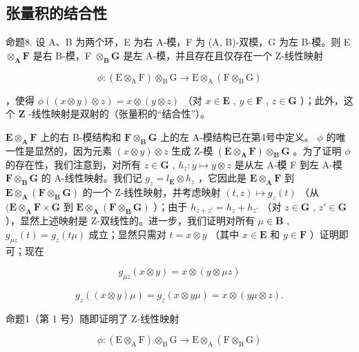 \subsection{张量积的结合性}

命题8. 设 A、B 为两个环，E 为右 A-模，F 为 (A, B)-双模，G 为左 B-模。则 E \(\otimes_{\mathbf{A}} \mathbf{F}\) 是右 B-模，F \(\otimes_{\mathbf{B}} \mathbf{G}\) 是左 A-模，并且存在且仅存在一个 Z-线性映射

\[
\phi : (\mathrm{E} \otimes_ {\mathrm{A}} \mathrm{F}) \otimes_ {\mathrm{B}} \mathrm{G} \rightarrow \mathrm{E} \otimes_ {\mathrm{A}} (\mathrm{F} \otimes_ {\mathrm{B}} \mathrm{G})
\]

，使得 \(\phi((x \otimes y) \otimes z) = x \otimes (y \otimes z)\) （对 \(x \in \mathbf{E}\) , \(y \in \mathbf{F}\) , \(z \in \mathbf{G}\) ）；此外，这个 \(\mathbf{Z}\) -线性映射是双射的（张量积的“结合性”）。

\(\mathbf{E} \otimes_{\mathbf{A}} \mathbf{F}\) 上的右 B-模结构和 \(\mathbf{F} \otimes_{\mathbf{B}} \mathbf{G}\) 上的左 A-模结构已在第4号中定义。 \(\phi\) 的唯一性是显然的，因为元素 \((x \otimes y) \otimes z\) 生成 Z-模 \((\mathbf{E} \otimes_{\mathbf{A}} \mathbf{F}) \otimes_{\mathbf{B}} \mathbf{G}\) 。为了证明 \(\phi\) 的存在性，我们注意到，对所有 \(z \in \mathbf{G}\) , \(h_z: y \mapsto y \otimes z\) 是从左 A-模 F 到左 A-模 \(\mathbf{F} \otimes_{\mathbf{B}} \mathbf{G}\) 的 A-线性映射。我们记 \(g_z = l_{\mathbf{E}} \otimes h_z\) ，它因此是 \(\mathbf{E} \otimes_{\mathbf{A}} \mathbf{F}\) 到 \(\mathbf{E} \otimes_{\mathbf{A}} (\mathbf{F} \otimes_{\mathbf{B}} \mathbf{G})\) 的一个 Z-线性映射，并考虑映射 \((t, z) \mapsto g_z(t)\) （从 \((\mathbf{E} \otimes_{\mathbf{A}} \mathbf{F} \times \mathbf{G}\) 到 \(\mathbf{E} \otimes_{\mathbf{A}} (\mathbf{F} \otimes_{\mathbf{B}} \mathbf{G})\) ）；由于 \(h_{z+z'} = h_z + h_{z'}\) （对 \(z \in \mathbf{G}\) , \(z' \in \mathbf{G}\) ），显然上述映射是 Z-双线性的。进一步，我们证明对所有 \(\mu \in \mathbf{B}\) , \(g_{\mu z}(t) = g_z(t\mu)\) 成立；显然只需对 \(t = x \otimes y\) （其中 \(x \in \mathbf{E}\) 和 \(y \in \mathbf{F}\) ）证明即可；现在

\[
g _ {\mu z} (x \otimes y) = x \otimes (y \otimes \mu z)
\]

\[
g _ {z} ((x \otimes y) \mu) = g _ {z} (x \otimes y \mu) = x \otimes (y \mu \otimes z).
\]

命题1（第 1 号）随即证明了 Z-线性映射

\[
\phi : (\mathrm{E} \otimes_ {\mathrm{A}} \mathrm{F}) \otimes_ {\mathrm{B}} \mathrm{G} \rightarrow \mathrm{E} \otimes_ {\mathrm{A}} (\mathrm{F} \otimes_ {\mathrm{B}} \mathrm{G})
\]

